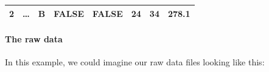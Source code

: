 \documentclass[]{article}
\newenvironment{Shaded}{\begin{snugshade}}{\end{snugshade}}
\newcommand{\KeywordTok}[1]{\textcolor[rgb]{0.13,0.29,0.53}{\textbf{#1}}}
\newcommand{\StringTok}[1]{\textcolor[rgb]{0.31,0.60,0.02}{#1}}
\newcommand{\OperatorTok}[1]{\textcolor[rgb]{0.81,0.36,0.00}{\textbf{#1}}}
\newcommand{\NormalTok}[1]{#1}
\let\oldparagraph\paragraph
\renewcommand{\paragraph}[1]{\oldparagraph{#1}\mbox{}}
\theoremstyle{definition}
\theoremstyle{definition}
\theoremstyle{definition}
\theoremstyle{remark}
\begin{document}
\begin{longtable}[]{@{}cccccccc@{}}
\begin{minipage}[t]{0.09\columnwidth}\centering\strut
2\strut
\end{minipage} & \begin{minipage}[t]{0.08\columnwidth}\centering\strut
\ldots{}\strut
\end{minipage} & \begin{minipage}[t]{0.12\columnwidth}\centering\strut
B\strut
\end{minipage} & \begin{minipage}[t]{0.09\columnwidth}\centering\strut
FALSE\strut
\end{minipage} & \begin{minipage}[t]{0.14\columnwidth}\centering\strut
FALSE\strut
\end{minipage} & \begin{minipage}[t]{0.06\columnwidth}\centering\strut
24\strut
\end{minipage} & \begin{minipage}[t]{0.15\columnwidth}\centering\strut
34\strut
\end{minipage} & \begin{minipage}[t]{0.07\columnwidth}\centering\strut
278.1\strut
\end{minipage}\tabularnewline
\bottomrule
\end{longtable}

\paragraph{The raw data}\label{the-raw-data}

In this example, we could imagine our raw data files looking like this:

\begin{Shaded}
\end{Shaded}
\end{document}
